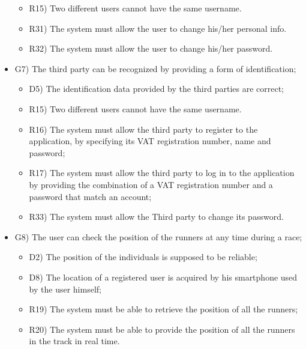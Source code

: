 \documentclass{article}
\begin{document}
\begin{legal}
\begin{legal}
\begin{legal}
\begin{itemize}
{\begin{itemize}
					\item R15) Two different users cannot have the same username.\\
					\item R31) The system must allow the user to change his/her personal info.\\
					\item R32) The system must allow the user to change his/her password.\\
					\end{itemize}
				}
				\item G7) The third party can be recognized by providing a form of identification; \\
				{\normalfont
					\begin{itemize}
					\item D5) The identification data provided by the third parties are correct;\\
					\item R15) Two different users cannot have the same username.\\
	 				\item R16) The system must allow the third party to register to the application, by specifying its VAT registration number, name and password;\\
					\item R17) The system must allow the third party to log in to the application by providing the combination of a VAT registration number and a password that match an account;\\
					\item R33) The system must allow the Third party to change its password.\\
					\end{itemize}
				}
				\item G8) The user can check the position of the runners at any time during a race;\\
				{\normalfont
					\begin{itemize}
					\item D2) The position of the individuals is supposed to be reliable;\\
					\item D8) The location of a registered user is acquired by his smartphone used by the user himself;\\
	 				\item R19) The system must be able to retrieve the position of all the runners;\\
					\item R20) The system must be able to provide the position of all the runners in the track in real time.\\

\end{itemize}}
\end{itemize}
\end{legal}
\end{legal}
\end{legal}
\end{document}
